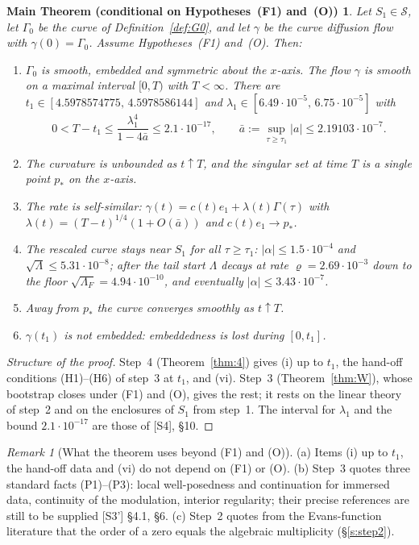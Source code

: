 \documentclass[11pt]{amsart}
\newtheorem*{maintheorem}{Main Theorem (conditional on Hypotheses~(F1) and~(O))}
\theoremstyle{definition}
\theoremstyle{remark}
\newtheorem{remark}[theorem]{Remark}
\newcommand{\Lam}{\Lambda}
\newcommand{\dref}[1]{[\textsf{#1}]}
\newcommand{\Sset}{\mathcal S}
\begin{document}
\begin{maintheorem}
Let $S_1\in\Sset$, let $\Gamma_0$ be the curve of Definition~\ref{def:G0}, and let $\gamma$ be the curve diffusion flow with $\gamma(0)=\Gamma_0$. Assume Hypotheses~\textup{(F1)} and~\textup{(O)}. Then:
\begin{enumerate}[label=\textup{(\roman*)},leftmargin=*,itemsep=1pt]
\item $\Gamma_0$ is smooth, embedded and symmetric about the $x$-axis. The flow $\gamma$ is smooth on a maximal interval $[0,T)$ with $T<\infty$. There are $t_1\in[4.5978574775,\,4.5978586144]$ and $\lambda_1\in[6.49\cdot10^{-5},\,6.75\cdot10^{-5}]$ with
\[
0<T-t_1\le\frac{\lambda_1^4}{1-4\bar a}\le2.1\cdot10^{-17},\qquad\bar a:=\sup_{\tau\ge\tau_1}|a|\le2.19103\cdot10^{-7}.
\]
\item The curvature is unbounded as $t\uparrow T$, and the singular set at time $T$ is a single point $p_*$ on the $x$-axis.
\item The rate is self-similar: $\gamma(t)=c(t)e_1+\lambda(t)\Gamma(\tau)$ with $\lambda(t)=(T-t)^{1/4}(1+O(\bar a))$ and $c(t)e_1\to p_*$.
\item The rescaled curve stays near $S_1$ for all $\tau\ge\tau_1$: $|\alpha|\le1.5\cdot10^{-4}$ and $\sqrt\Lam\le5.31\cdot10^{-8}$; after the tail start $\Lam$ decays at rate $\varrho=2.69\cdot10^{-3}$ down to the floor $\sqrt{\Lam_F}=4.94\cdot10^{-10}$, and eventually $|\alpha|\le3.43\cdot10^{-7}$.
\item Away from $p_*$ the curve converges smoothly as $t\uparrow T$.
\item $\gamma(t_1)$ is not embedded: embeddedness is lost during $[0,t_1]$.
\end{enumerate}
\end{maintheorem}

\begin{proof}[Structure of the proof]
Step~4 (Theorem~\ref{thm:4}) gives (i) up to $t_1$, the hand-off conditions (H1)--(H6) of step~3 at $t_1$, and (vi). Step~3 (Theorem~\ref{thm:W}), whose bootstrap closes under (F1) and (O), gives the rest; it rests on the linear theory of step~2 and on the enclosures of $S_1$ from step~1. The interval for $\lambda_1$ and the bound $2.1\cdot10^{-17}$ are those of \dref{S4}, \S10.
\end{proof}

\begin{remark}[What the theorem uses beyond (F1) and (O)]\label{rem:uses}
(a) Items (i) up to $t_1$, the hand-off data and (vi) do not depend on (F1) or (O). (b) Step~3 quotes three standard facts (P1)--(P3): local well-posedness and continuation for immersed data, continuity of the modulation, interior regularity; their precise references are still to be supplied \dref{S3'} \S4.1, \S6. (c) Step~2 quotes from the Evans-function literature that the order of a zero equals the algebraic multiplicity \cite{AlexanderGardnerJones1990,KapitulaPromislow2013,LatushkinSukhtayev2010} (\S\ref{s:step2}).
\end{remark}
\end{document}
